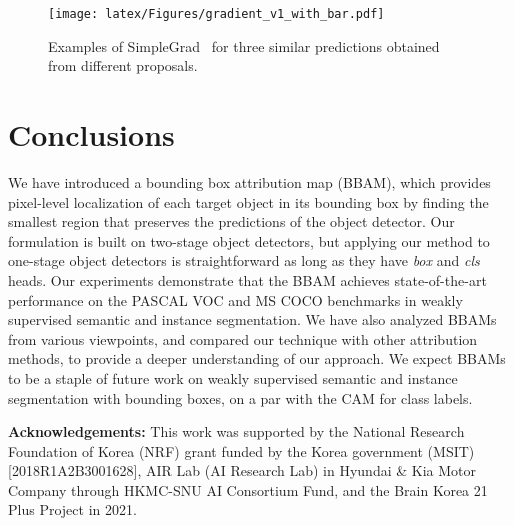 \documentclass[final]{cvpr}
\begin{document}
\begin{figure}[t]
\centering
\texttt{[image: latex/Figures/gradient\_v1\_with\_bar.pdf]}
\vspace{-1.5em}
\caption{\label{gradient_ex} Examples of SimpleGrad~\cite{zeiler2014visualizing} for three similar predictions obtained from different proposals.}
\vspace{-1em}
\end{figure} 


\vspace{-0.15em}
\section{Conclusions}
\vspace{-0.15em}
We have introduced a bounding box attribution map (BBAM), which provides pixel-level localization of each target object in its bounding box by finding the smallest region that preserves the predictions of the object detector.
Our formulation is built on two-stage object detectors, but applying our method to one-stage object detectors is straightforward as long as they have \textit{box} and \textit{cls} heads.
Our experiments demonstrate that the BBAM achieves state-of-the-art performance on the PASCAL VOC and MS COCO benchmarks in weakly supervised semantic and instance segmentation.
We have also analyzed BBAMs from various viewpoints, and compared our technique with other attribution methods, to provide a deeper understanding of our approach.
We expect BBAMs to be a staple of future work on weakly supervised semantic and instance segmentation with bounding boxes, on a par with the CAM for class labels.  


\bigskip
\noindent\textbf{Acknowledgements:}
This work was supported by the National Research Foundation of Korea (NRF) grant funded by the Korea government (MSIT) [2018R1A2B3001628], AIR Lab (AI Research Lab) in Hyundai \& Kia Motor Company through HKMC-SNU AI Consortium Fund, and the Brain Korea 21 Plus Project in 2021.




{\small


}

\setcounter{section}{0}
\renewcommand\thesection{\Alph{section}}
\setcounter{table}{0}
\renewcommand{\thetable}{A\arabic{table}}
\setcounter{figure}{0}
\renewcommand{\thefigure}{A\arabic{figure}}

\clearpage

\renewcommand{\tabcolsep}{2pt}
\end{document}
